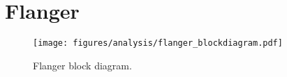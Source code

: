 \section{Flanger}

\begin{figure}[htbp]
	\centering
	\texttt{[image: figures/analysis/flanger\_blockdiagram.pdf]}
	\caption{Flanger block diagram.}
	\label{fig:flanger_blockdiagram_design}
\end{figure}
